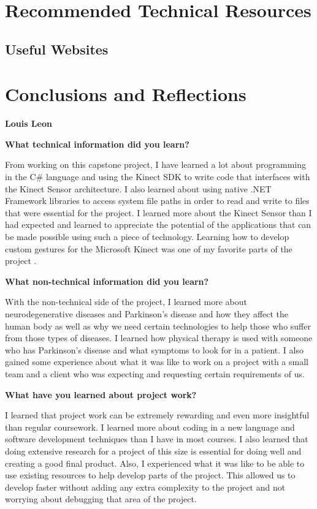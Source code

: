 \documentclass[onecolumn, draftclsnofoot,10pt, compsoc]{IEEEtran}
\begin{document}
\section{Recommended Technical Resources}
\subsection{Useful Websites}

\section{Conclusions and Reflections}
\begin{flushleft}
{\large\textbf{Louis Leon}\par}
\textbf{What technical information did you learn?}\par
From working on this capstone project, I have learned a lot about programming in the C\# language and using the Kinect SDK to write code that interfaces with the Kinect Sensor architecture. I also learned about using native .NET Framework libraries to access system file paths in order to read and write to files that were essential for the project. I learned more about the Kinect Sensor than I had expected and learned to appreciate the potential of the applications that can be made possible using such a piece of technology. Learning how to develop custom gestures for the Microsoft Kinect was one of my favorite parts of the project \cite{KinectDevelop}. 

\textbf{What non-technical information did you learn?}\par
With the non-technical side of the project, I learned more about neurodegenerative diseases and Parkinson's disease and how they affect the human body as well as why we need certain technologies to help those who suffer from those types of diseases. I learned how physical therapy is used with someone who has Parkinson's disease and what symptoms to look for in a patient. I also gained some experience about what it was like to work on a project with a small team and a client who was expecting and requesting certain requirements of us.

\textbf{What have you learned about project work?}\par
I learned that project work can be extremely rewarding and even more insightful than regular coursework. I learned more about coding in a new language and software development techniques than I have in most courses. I also learned that doing extensive research for a project of this size is essential for doing well and creating a good final product. Also, I experienced what it was like to be able to use existing resources to help develop parts of the project. This allowed us to develop faster without adding any extra complexity to the project and not worrying about debugging that area of the project.


\end{flushleft}
\end{document}
